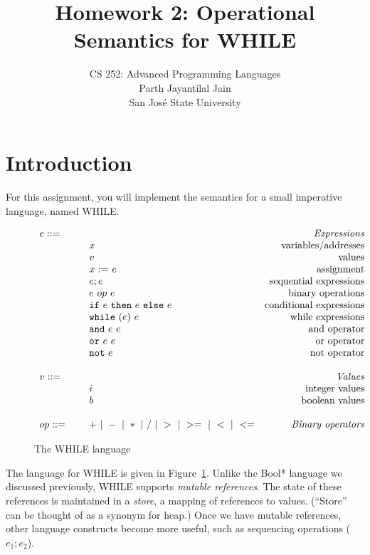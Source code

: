 \documentclass{article}
\title{Homework 2: Operational Semantics for WHILE}
\author{
  CS 252: Advanced Programming Languages \\
  Parth Jayantilal Jain \\
  San Jos\'{e} State University \\
  }
\date{}
\begin{document}
\maketitle

\section{Introduction}

For this assignment,
you will implement the semantics for a small imperative language, named WHILE.

\newcommand{\mydefhead}[2]{\multicolumn{2}{l}{{#1}}&\mbox{\emph{#2}}\\}
\newcommand{\mydefcase}[2]{\qquad\qquad& #1 &\mbox{#2}\\}

\newcommand{\assign}[2]{#1~{:=}~#2}
\newcommand{\ife}[3]{\mbox{\tt if}~{#1}~\mbox{\tt then}~{#2}~\mbox{\tt else}~{#3}}
\newcommand{\whilee}[2]{\mbox{\tt while}~(#1)~#2}
\newcommand{\true}{\mbox{\tt true}}
\newcommand{\false}{\mbox{\tt false}}
\newcommand{\andee}[2]{{\tt and}~ {#1}~{#2}}
\newcommand{\oree}[2]{{\tt or}~ {#1}~{#2}}
\newcommand{\note}[1]{{\tt not}~ {#1}}

\begin{figure}\label{fig:lang}
\caption{The WHILE language}
\[
\begin{array}{llr}
  \mydefhead{e ::=\qquad\qquad\qquad\qquad}{Expressions}
  \mydefcase{x}{variables/addresses}
  \mydefcase{v}{values}
  \mydefcase{\assign x e}{assignment}
  \mydefcase{e; e}{sequential expressions}
  \mydefcase{e ~op~ e}{binary operations}
  \mydefcase{\ife e e e}{conditional expressions}
  \mydefcase{\whilee e e}{while expressions}
  \mydefcase{\andee e e}{and operator}
  \mydefcase{\oree e e}{or operator}
  \mydefcase{\note e}{not operator}
  \\
  \mydefhead{v ::=\qquad\qquad\qquad\qquad}{Values}
  \mydefcase{i}{integer values}
  \mydefcase{b}{boolean values}
  \\
  op ::= & + ~|~ - ~|~ * ~|~ / ~|~ > ~|~ >= ~|~ < ~|~ <=  & \mbox{\emph{Binary operators}} \\
\end{array}
\]
\end{figure}

The language for WHILE is given in Figure~\ref{fig:lang}.
Unlike the Bool* language we discussed previously,
WHILE supports \emph{mutable references}.
The state of these references is maintained in a \emph{store},
a mapping of references to values.
(``Store'' can be thought of as a synonym for heap.)
Once we have mutable references, other language constructs become more useful,
such as sequencing operations ($e_1;e_2$).
\end{document}
